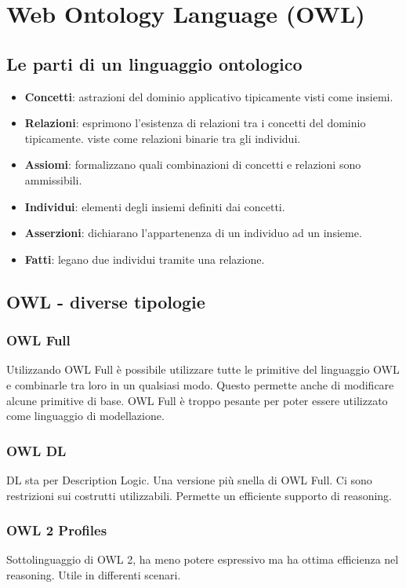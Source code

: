 \section{Web Ontology Language (OWL)}

\subsection{Le parti di un linguaggio ontologico}
\begin{itemize}
	\item \textbf{Concetti}: astrazioni del dominio applicativo tipicamente visti come insiemi.
	\item \textbf{Relazioni}: esprimono l’esistenza di relazioni tra i concetti del dominio tipicamente.
	viste come relazioni binarie tra gli individui.
	\item \textbf{Assiomi}: formalizzano quali combinazioni di concetti e relazioni sono ammissibili.
	\item \textbf{Individui}: elementi degli insiemi definiti dai concetti.
	\item \textbf{Asserzioni}: dichiarano l’appartenenza di un individuo ad un insieme.
	\item \textbf{Fatti}: legano due individui tramite una relazione.
\end{itemize}

\subsection{OWL - diverse tipologie}
\subsubsection{OWL Full}
Utilizzando OWL Full è possibile utilizzare tutte le primitive del linguaggio OWL e combinarle tra loro in un qualsiasi modo. Questo permette anche di modificare alcune primitive di base. OWL Full è troppo pesante per poter essere utilizzato come linguaggio di modellazione.
\subsubsection{OWL DL}
DL sta per Description Logic. Una versione più snella di OWL Full. Ci sono restrizioni sui costrutti utilizzabili. Permette un efficiente supporto di reasoning.
\subsubsection{OWL 2 Profiles}
Sottolinguaggio di OWL 2, ha meno potere espressivo ma ha ottima efficienza nel reasoning. Utile in differenti scenari.

